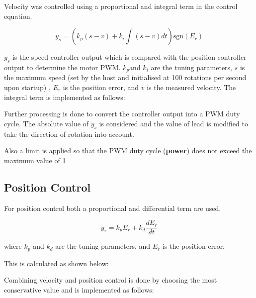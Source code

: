 \documentclass{article}
\begin{document}
\noindent
Velocity was controlled using a proportional and integral term in the control equation.

\[ y_s = \left( k_p(s-v)+ k_i\int(s-v)dt\right)\textrm{sgn}(E_r)\]

\noindent
\(y_s\) is the speed controller output which is compared with the position controller output to determine the motor PWM. \(k_p\)and \(k_i\) are the tuning parameters, \(s\) is the maximum speed (set by the host and initialised at 100 rotations per second upon startup) , \(E_r\) is the position error, and \(v\) is the measured velocity. The integral term is implemented as follows:

\bigskip




\bigskip

\noindent
Further processing is done to convert the controller output into a PWM duty cycle. The absolute value of \(y_s\) is considered and the value of lead is modified to take the direction of rotation into account.

\bigskip



\bigskip

\noindent
Also a limit is applied so that the PWM duty cycle (\textbf{power}) does not exceed the maximum value of 1

\bigskip



\bigskip

\subsection{Position Control}

\noindent
For position control both a proportional and differential term are used.

\[y_r = k_pE_r + k_d \frac{dE_r}{dt}\]

\noindent
where \(k_p\) and \(k_d\) are the tuning parameters, and \(E_r\) is the position error.

\bigskip

\noindent
This is calculated as shown below:

\bigskip

\bigskip

\noindent
Combining velocity and position control is done by choosing the most conservative value and is implemented as follows:
\end{document}
